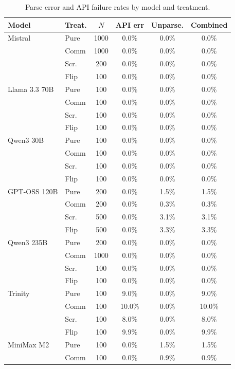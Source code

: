 \begin{table}[t]
\centering
\caption{Parse error and API failure rates by model and treatment.}
\label{tab:parse_errors}
\footnotesize
\setlength{\tabcolsep}{3pt}
\begin{tabular}{llcccc}
\toprule
Model & Treat. & $N$ & API err & Unparse. & Combined \\
\midrule
Mistral & Pure & 1000 & 0.0\% & 0.0\% & 0.0\% \\
 & Comm & 1000 & 0.0\% & 0.0\% & 0.0\% \\
 & Scr. & 200 & 0.0\% & 0.0\% & 0.0\% \\
 & Flip & 100 & 0.0\% & 0.0\% & 0.0\% \\
\addlinespace
Llama 3.3 70B & Pure & 100 & 0.0\% & 0.0\% & 0.0\% \\
 & Comm & 100 & 0.0\% & 0.0\% & 0.0\% \\
 & Scr. & 100 & 0.0\% & 0.0\% & 0.0\% \\
 & Flip & 100 & 0.0\% & 0.0\% & 0.0\% \\
\addlinespace
Qwen3 30B & Pure & 100 & 0.0\% & 0.0\% & 0.0\% \\
 & Comm & 100 & 0.0\% & 0.0\% & 0.0\% \\
 & Scr. & 100 & 0.0\% & 0.0\% & 0.0\% \\
 & Flip & 100 & 0.0\% & 0.0\% & 0.0\% \\
\addlinespace
GPT-OSS 120B & Pure & 200 & 0.0\% & 1.5\% & 1.5\% \\
 & Comm & 200 & 0.0\% & 0.3\% & 0.3\% \\
 & Scr. & 500 & 0.0\% & 3.1\% & 3.1\% \\
 & Flip & 500 & 0.0\% & 3.3\% & 3.3\% \\
\addlinespace
Qwen3 235B & Pure & 200 & 0.0\% & 0.0\% & 0.0\% \\
 & Comm & 1000 & 0.0\% & 0.0\% & 0.0\% \\
 & Scr. & 100 & 0.0\% & 0.0\% & 0.0\% \\
 & Flip & 100 & 0.0\% & 0.0\% & 0.0\% \\
\addlinespace
Trinity & Pure & 100 & 9.0\% & 0.0\% & 9.0\% \\
 & Comm & 100 & 10.0\% & 0.0\% & 10.0\% \\
 & Scr. & 100 & 8.0\% & 0.0\% & 8.0\% \\
 & Flip & 100 & 9.9\% & 0.0\% & 9.9\% \\
\addlinespace
MiniMax M2 & Pure & 100 & 0.0\% & 1.5\% & 1.5\% \\
 & Comm & 100 & 0.0\% & 0.9\% & 0.9\% \\

\end{tabular}
\end{table}
